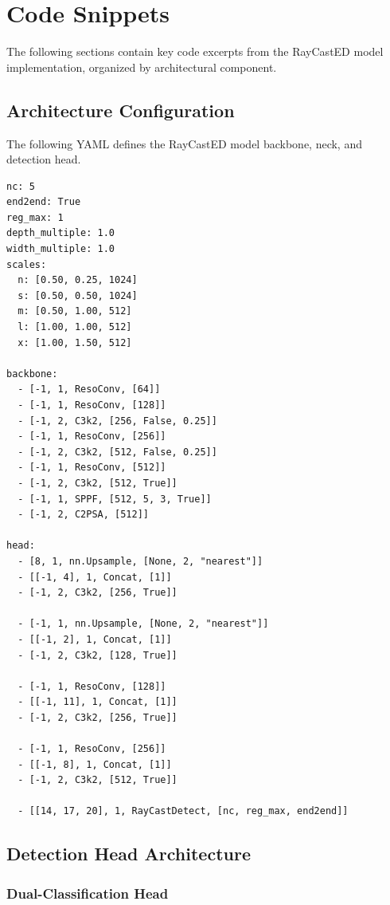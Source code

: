 \section{Code Snippets}

The following sections contain key code excerpts from the RayCastED model
implementation, organized by architectural component.

\subsection{Architecture Configuration}

The following YAML defines the RayCastED model backbone, neck, and detection
head.

\begin{lstlisting}[language=XML]
nc: 5
end2end: True
reg_max: 1
depth_multiple: 1.0
width_multiple: 1.0
scales:
  n: [0.50, 0.25, 1024]
  s: [0.50, 0.50, 1024]
  m: [0.50, 1.00, 512]
  l: [1.00, 1.00, 512]
  x: [1.00, 1.50, 512]

backbone:
  - [-1, 1, ResoConv, [64]]
  - [-1, 1, ResoConv, [128]]
  - [-1, 2, C3k2, [256, False, 0.25]]
  - [-1, 1, ResoConv, [256]]
  - [-1, 2, C3k2, [512, False, 0.25]]
  - [-1, 1, ResoConv, [512]]
  - [-1, 2, C3k2, [512, True]]
  - [-1, 1, SPPF, [512, 5, 3, True]]
  - [-1, 2, C2PSA, [512]]

head:
  - [8, 1, nn.Upsample, [None, 2, "nearest"]]
  - [[-1, 4], 1, Concat, [1]]
  - [-1, 2, C3k2, [256, True]]

  - [-1, 1, nn.Upsample, [None, 2, "nearest"]]
  - [[-1, 2], 1, Concat, [1]]
  - [-1, 2, C3k2, [128, True]]

  - [-1, 1, ResoConv, [128]]
  - [[-1, 11], 1, Concat, [1]]
  - [-1, 2, C3k2, [256, True]]

  - [-1, 1, ResoConv, [256]]
  - [[-1, 8], 1, Concat, [1]]
  - [-1, 2, C3k2, [512, True]]

  - [[14, 17, 20], 1, RayCastDetect, [nc, reg_max, end2end]]
\end{lstlisting}

\subsection{Detection Head Architecture}

\subsubsection{Dual-Classification Head}

